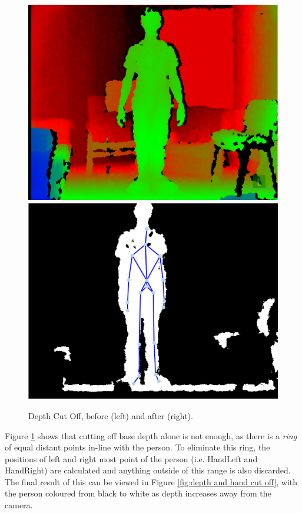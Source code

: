 \begin{figure}[h]
\begin{center}
\includegraphics[scale=0.4]{./design/parse1} 
\includegraphics[scale=0.4]{./design/parse2}
\end{center}
\caption{Depth Cut Off, before (left) and after (right).}
\label{fig:depth cut off}
\end{figure} 

Figure \ref{fig:depth cut off} shows that cutting off base depth alone is not enough, as there is a \textit{ring} of equal distant points in-line with the person. To eliminate this ring, the positions of left and right most point of the person (i.e. HandLeft and HandRight) are calculated and anything outside of this range is also discarded. The final result of this can be viewed in Figure \ref{fig:depth and hand cut off}, with the person coloured from black to white as depth increases away from the camera.\\


